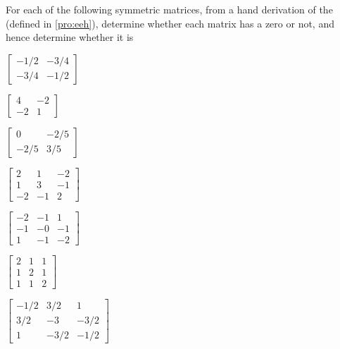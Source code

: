 \begin{exercise}  
For each of the following symmetric matrices, from a hand derivation of the  (defined in \cref{pro:eeh}), determine whether each matrix has a zero  or not, and hence determine whether it is  
\begin{Parts}
\item \(\begin{bmatrix} -1/2 & -3/4
\\ -3/4 & -1/2 \end{bmatrix}\)

\item \(\begin{bmatrix} 4 & -2
\\ -2 & 1 \end{bmatrix}\)

\item \(\begin{bmatrix} 0 & -2/5
\\ -2/5 & 3/5 \end{bmatrix}\)

\item \(\begin{bmatrix} 2 & 1 & -2
\\ 1 & 3 & -1
\\ -2 & -1 & 2 \end{bmatrix}\)

\begin{OmitV1}
\item \(\begin{bmatrix} -2 & -1 & 1
\\ -1 & -0 & -1
\\ 1 & -1 & -2 \end{bmatrix}\)

\item \(\begin{bmatrix} 2 & 1 & 1
\\ 1 & 2 & 1
\\ 1 & 1 & 2 \end{bmatrix}\)

\item \(\begin{bmatrix} -1/2 & 3/2 & 1
\\ 3/2 & -3 & -3/2
\\ 1 & -3/2 & -1/2 \end{bmatrix}\)


\end{OmitV1}
\end{Parts}
\end{exercise}
